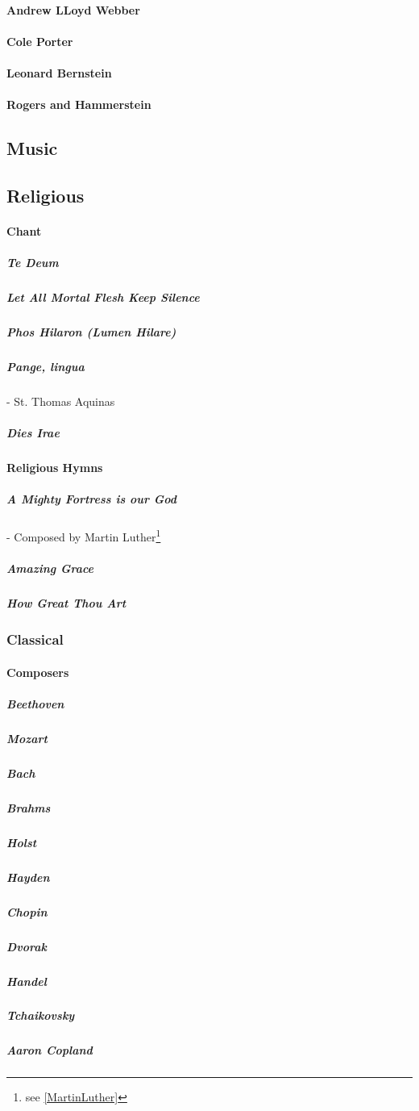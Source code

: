 		\paragraph{Andrew LLoyd Webber}
		\paragraph{Cole Porter}
		\paragraph{Leonard Bernstein}
		\paragraph{Rogers and Hammerstein}
		
		\subsection{Music}
			\subsection{Religious}
				\paragraph{Chant}
					\subparagraph{Te Deum}
					\subparagraph{Let All Mortal Flesh Keep Silence}
					\subparagraph{Phos Hilaron (Lumen Hilare)}
					\subparagraph{Pange, lingua} - St. Thomas Aquinas
					\subparagraph{Dies Irae}
				\paragraph{Religious Hymns}
					\subparagraph{A Mighty Fortress is our God} - Composed by Martin Luther\footnote{see \cref{MartinLuther} }
					\subparagraph{Amazing Grace}
					\subparagraph{How Great Thou Art}


					
					
			\subsubsection{Classical}
				\paragraph{Composers}
					\subparagraph{Beethoven}
					\subparagraph{Mozart}
					\subparagraph{Bach}
					\subparagraph{Brahms}
					\subparagraph{Holst}
					\subparagraph{Hayden}
					\subparagraph{Chopin}
					\subparagraph{Dvorak}
					\subparagraph{Handel}
					\subparagraph{Tchaikovsky}
					\subparagraph{Aaron Copland}
					
